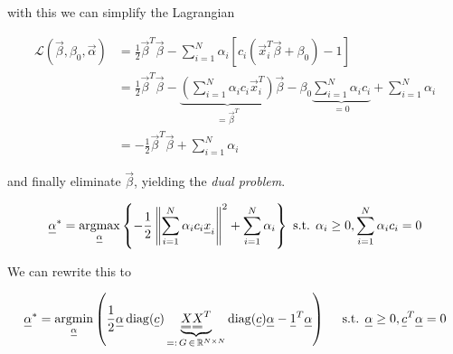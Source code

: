 
with this we can simplify the Lagrangian

\begin{equation}
    \begin{aligned}
    \mathcal{L}(\vec{\beta}, \beta_0, \vec{\alpha}) &= \frac{1}{2} \vec{\beta}^T \vec{\beta} - \sum_{i=1}^N \alpha_i \left[ c_i \left( \vec{x}_i^T \vec{\beta} + \beta_0 \right) - 1 \right] \\
                                                    &= \frac{1}{2} \vec{\beta}^T \vec{\beta} - \underbrace{\left(\sum_{i=1}^N \alpha_i c_i \vec{x}_i^T\right)}_{=\vec{\beta}^T} \vec{\beta} - \beta_0 \underbrace{\sum_{i=1}^N \alpha_i c_i}_{=0} + \sum_{i=1}^N \alpha_i  \\
                                                    &= - \frac{1}{2} \vec{\beta}^T \vec{\beta} + \sum_{i=1}^N \alpha_i
    \end{aligned}
\end{equation}

and finally eliminate $\vec{\beta}$, yielding the \textit{dual problem}.

\begin{equation}
    \vec{\alpha}^* = \argmax_{\vec{\alpha}} \left\{ -\frac{1}{2} \norm{\sum_{i=1}^N \alpha_i c_i \vec{x}_i}^2 + \sum_{i=1}^N \alpha_i \right\} \text{ s.t. } \alpha_i \geq 0, \sum_{i=1}^N \alpha_i c_i = 0
\end{equation}

We can rewrite this to

\begin{equation}
    \vec{\alpha}^* = \argmin_{\vec{\alpha}} \left( \frac{1}{2} \vec{\alpha} \operatorname{diag}(\vec{c}) \underbrace{\mat{X} \mat{X}^T}_{=:\, G \, \in \, \mathbb{R}^{N\times N}} \operatorname{diag}(\vec{c}) \vec{\alpha} - \vec{1}^T \vec{\alpha} \right) \quad \text{ s.t. } \vec{\alpha} \geq 0, \vec{c}^T \vec{\alpha} = 0
\end{equation}

